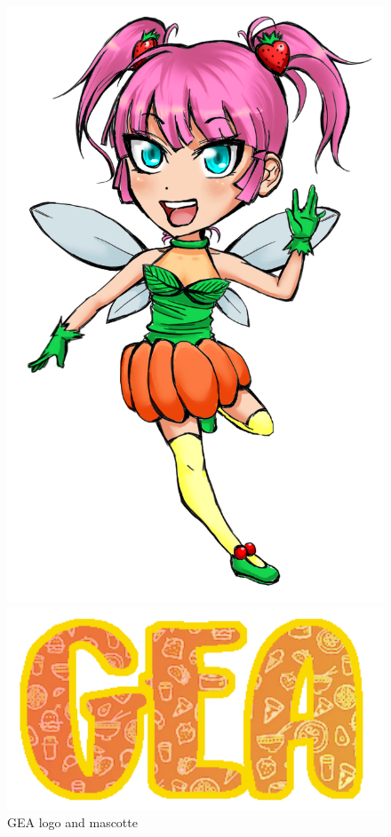 \begin{figure}[H]
\centering
\begin{minipage}[c]{.40\textwidth}
\includegraphics[width=1\textwidth]{immagini/geamasc.png}
\end{minipage}%
\hspace{10mm}%
\begin{minipage}[c]{.40\textwidth}
\includegraphics[width=1\textwidth]{immagini/GEA.png}
\end{minipage}
\caption{GEA logo and mascotte}\label{fig:logo}
\end{figure}